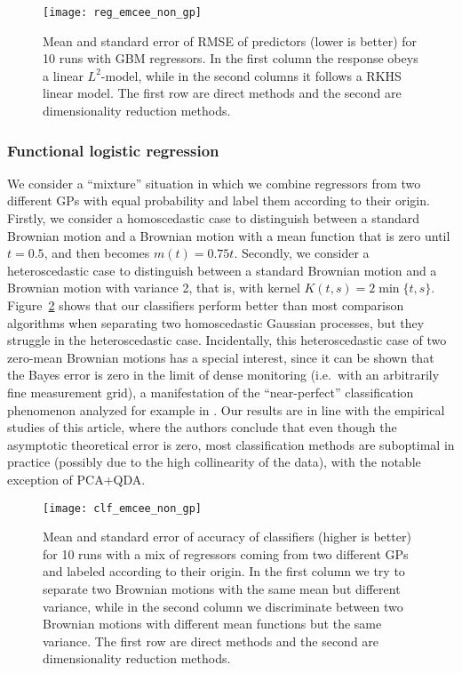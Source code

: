 \begin{figure}[ht!]
    \centering
    \texttt{[image: reg\_emcee\_non\_gp]}
    \caption{Mean and standard error of RMSE of predictors (lower is better) for 10 runs with GBM regressors. In the first column the response obeys a linear \(L^2\)-model, while in the second columns it follows a RKHS linear model. The first row are direct methods and the second are dimensionality reduction methods.}\label{fig:reg_emcee_non_gp}
\end{figure}

\subsubsection*{Functional logistic regression}

We consider a ``mixture'' situation in which we combine regressors from two different GPs with equal probability and label them according to their origin. Firstly, we consider a homoscedastic case to distinguish between a standard Brownian motion and a Brownian motion with a mean function that is zero until \(t=0.5\), and then becomes \(m(t)=0.75t\). Secondly, we consider a heteroscedastic case to distinguish between a standard Brownian motion and a Brownian motion with variance 2, that is, with kernel \(K(t,s)=2\min\{t,s\}\). Figure~\ref{fig:clf_emcee_non_gp} shows that our classifiers perform better than most comparison algorithms when separating two homoscedastic Gaussian processes, but they struggle in the heteroscedastic case. Incidentally, this heteroscedastic case of two zero-mean Brownian motions has a special interest, since it can be shown that the Bayes error is zero in the limit of dense monitoring (i.e.\ with an arbitrarily fine measurement grid), a manifestation of the ``near-perfect'' classification phenomenon analyzed for example in \citet{torrecilla2020optimal}. Our results are in line with the empirical studies of this article, where the authors conclude that even though the asymptotic theoretical error is zero, most classification methods are suboptimal in practice (possibly due to the high collinearity of the data), with the notable exception of PCA+QDA.

\begin{figure}[ht!]
    \centering
    \texttt{[image: clf\_emcee\_non\_gp]}
    \caption{Mean and standard error of accuracy of classifiers (higher is better) for 10 runs with a mix of regressors coming from two different GPs and labeled according to their origin. In the first column we try to separate two Brownian motions with the same mean but different variance, while in the second column we discriminate between two Brownian motions with different mean functions but the same variance. The first row are direct methods and the second are dimensionality reduction methods.}\label{fig:clf_emcee_non_gp}
\end{figure}

